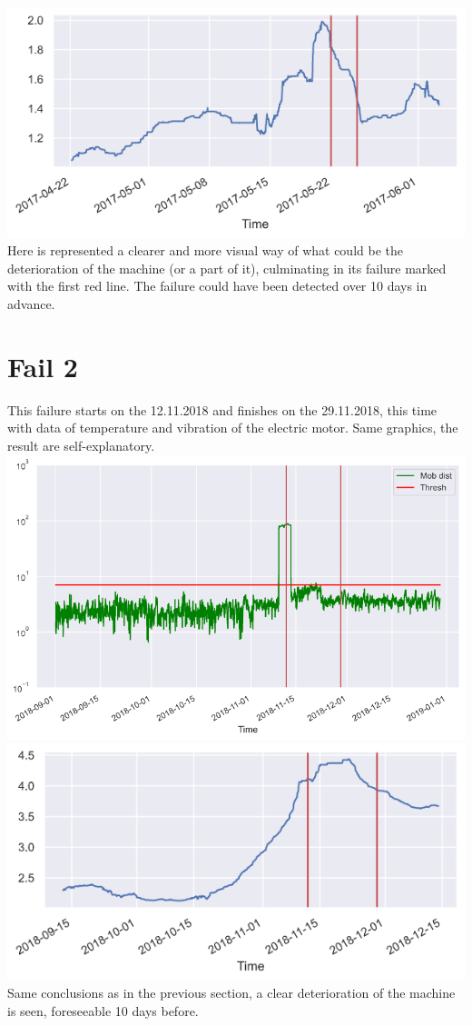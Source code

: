 \documentclass[
]{article}
\begin{document}
\includegraphics{relevant_graphs/6_1_T.png} Here is represented a
clearer and more visual way of what could be the deterioration of the
machine (or a part of it), culminating in its failure marked with the
first red line. The failure could have been detected over 10 days in
advance.

\hypertarget{fail-2}{%
\section{Fail 2}\label{fail-2}}

This failure starts on the 12.11.2018 and finishes on the 29.11.2018,
this time with data of temperature and vibration of the electric motor.
Same graphics, the result are self-explanatory.\\
\includegraphics{relevant_graphs/7_3_AM.png}
\includegraphics{relevant_graphs/7_3_T.png} Same conclusions as in the
previous section, a clear deterioration of the machine is seen,
foreseeable 10 days before.
\end{document}
